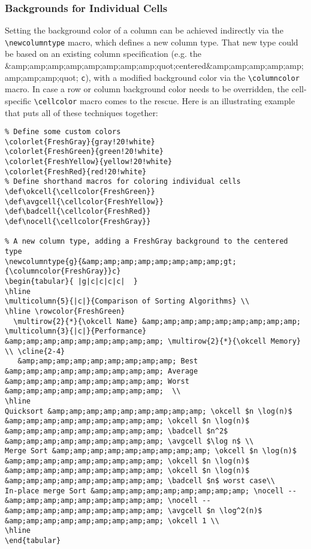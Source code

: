 \subsubsection{Backgrounds for Individual Cells}

Setting the background color of a column can be achieved indirectly via the \verb|\newcolumntype| macro, which defines a new column type. That new type could be based on an existing column specification (e.g. the &amp;amp;amp;amp;amp;amp;amp;amp;quot;centered&amp;amp;amp;amp;amp;amp;amp;amp;quot; \verb|c|), with a modified background color via the \verb|\columncolor| macro. In case a row or column background color needs to be overridden, the cell-specific \verb|\cellcolor| macro comes to the rescue. Here is an illustrating example that puts all of these techniques together:

\begin{lstlisting}
% Define some custom colors
\colorlet{FreshGray}{gray!20!white}
\colorlet{FreshGreen}{green!20!white}
\colorlet{FreshYellow}{yellow!20!white}
\colorlet{FreshRed}{red!20!white}
% Define shorthand macros for coloring individual cells
\def\okcell{\cellcolor{FreshGreen}}
\def\avgcell{\cellcolor{FreshYellow}}
\def\badcell{\cellcolor{FreshRed}}
\def\nocell{\cellcolor{FreshGray}}

% A new column type, adding a FreshGray background to the centered type
\newcolumntype{g}{&amp;amp;amp;amp;amp;amp;amp;amp;gt;{\columncolor{FreshGray}}c}
\begin{tabular}{ |g|c|c|c|c|  }
\hline
\multicolumn{5}{|c|}{Comparison of Sorting Algorithms} \\
\hline \rowcolor{FreshGreen} 
  \multirow{2}{*}{\okcell Name} &amp;amp;amp;amp;amp;amp;amp;amp;amp; \multicolumn{3}{|c|}{Performance} &amp;amp;amp;amp;amp;amp;amp;amp;amp; \multirow{2}{*}{\okcell Memory} \\ \cline{2-4}
   &amp;amp;amp;amp;amp;amp;amp;amp;amp; Best &amp;amp;amp;amp;amp;amp;amp;amp;amp; Average &amp;amp;amp;amp;amp;amp;amp;amp;amp; Worst &amp;amp;amp;amp;amp;amp;amp;amp;amp;  \\
\hline
Quicksort &amp;amp;amp;amp;amp;amp;amp;amp;amp; \okcell $n \log(n)$ &amp;amp;amp;amp;amp;amp;amp;amp;amp; \okcell $n \log(n)$ &amp;amp;amp;amp;amp;amp;amp;amp;amp; \badcell $n^2$ &amp;amp;amp;amp;amp;amp;amp;amp;amp; \avgcell $\log n$ \\
Merge Sort &amp;amp;amp;amp;amp;amp;amp;amp;amp; \okcell $n \log(n)$ &amp;amp;amp;amp;amp;amp;amp;amp;amp; \okcell $n \log(n)$ &amp;amp;amp;amp;amp;amp;amp;amp;amp; \okcell $n \log(n)$ &amp;amp;amp;amp;amp;amp;amp;amp;amp; \badcell $n$ worst case\\
In-place merge Sort &amp;amp;amp;amp;amp;amp;amp;amp;amp; \nocell -- &amp;amp;amp;amp;amp;amp;amp;amp;amp; \nocell -- &amp;amp;amp;amp;amp;amp;amp;amp;amp; \avgcell $n \log^2(n)$ &amp;amp;amp;amp;amp;amp;amp;amp;amp; \okcell 1 \\
\hline
\end{tabular}
\end{lstlisting}

